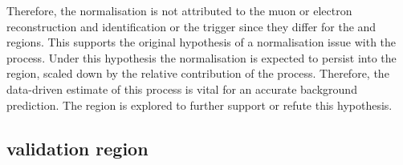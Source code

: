 %
Therefore, the normalisation is not attributed to the muon or electron
reconstruction and identification or the trigger since they differ for the
\muplusjets and \eleplusjets regions. This supports the original hypothesis of
a normalisation issue with the \IWj process. Under this hypothesis the
normalisation is expected to persist into the \metplusjets region, scaled down
by the relative contribution of the \IWj process. Therefore, the data-driven
estimate of this process is vital for an accurate background prediction. The
\tauplusjets region is explored to further support or refute this hypothesis.


\subsection{\tauplusjets validation region}

